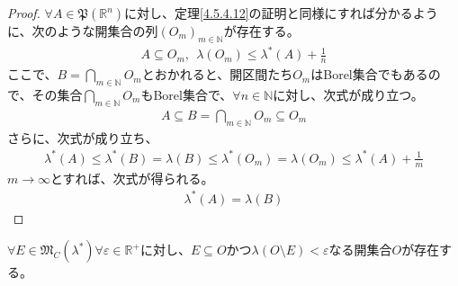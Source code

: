 \documentclass[dvipdfmx]{jsarticle}
\begin{document}
\begin{proof}
$\forall A \in \mathfrak{P}\left( \mathbb{R}^{n} \right)$に対し、定理\ref{4.5.4.12}の証明と同様にすれば分かるように、次のような開集合の列$\left( O_{m} \right)_{m \in \mathbb{N}}$が存在する。
\begin{align*}
A \subseteq O_{m},\ \ \lambda\left( O_{m} \right) \leq \lambda^{*}(A) + \frac{1}{n}
\end{align*}
ここで、$B = \bigcap_{m \in \mathbb{N}} O_{m}$とおかれると、開区間たち$O_{m}$はBorel集合でもあるので、その集合$\bigcap_{m \in \mathbb{N}} O_{m}$もBorel集合で、$\forall n \in \mathbb{N}$に対し、次式が成り立つ。
\begin{align*}
A \subseteq B = \bigcap_{m \in \mathbb{N}} O_{m} \subseteq O_{m}
\end{align*}
さらに、次式が成り立ち、
\begin{align*}
\lambda^{*}(A) \leq \lambda^{*}(B) = \lambda(B) \leq \lambda^{*}\left( O_{m} \right) = \lambda\left( O_{m} \right) \leq \lambda^{*}(A) + \frac{1}{m}
\end{align*}
$m \rightarrow \infty$とすれば、次式が得られる。
\begin{align*}
\lambda^{*}(A) = \lambda(B)
\end{align*}
\end{proof}
\begin{thm}\label{4.5.4.14}
$\forall E \in \mathfrak{M}_{C}\left( \lambda^{*} \right)\forall\varepsilon \in \mathbb{R}^{+}$に対し、$E \subseteq O$かつ$\lambda(O \setminus E) < \varepsilon$なる開集合$O$が存在する。
\end{thm}
\end{document}
